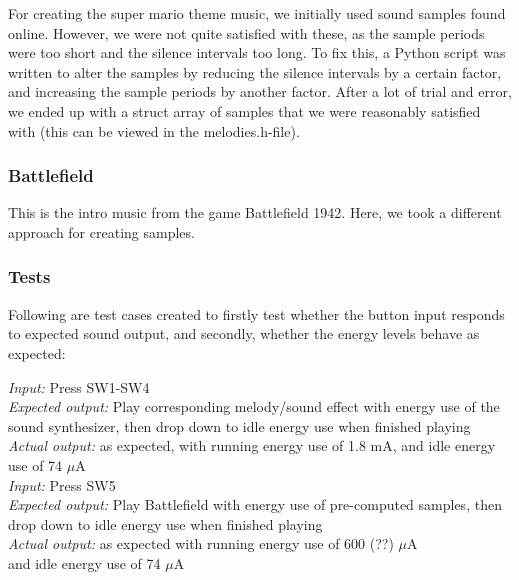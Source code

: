 For creating the super mario theme music, we initially used sound samples found online. However, we were not quite satisfied with these, as the sample periods were too short and the silence intervals too long. To fix this, a Python script was written to alter the samples by reducing the silence intervals by a certain factor, and increasing the sample periods by another factor. After a lot of trial and error, we ended up with a struct array of samples that we were reasonably satisfied with (this can be viewed in the melodies.h-file).

\subsubsection{Battlefield}

This is the intro music from the game Battlefield 1942. Here, we took a different approach for creating samples. 

\subsubsection{Tests}

Following are test cases created to firstly test whether the button input responds to expected sound output, and secondly, whether the energy levels behave as expected:



\emph{Input: } Press SW1-SW4\\
\emph{Expected output: } Play corresponding melody/sound effect with energy use of the sound synthesizer, then drop down to idle energy use when finished playing\\
\emph{Actual output: } as expected, with running energy use of 1.8 mA, and idle energy use of 74 $\mu$A \\


\emph{Input: } Press SW5\\
\emph{Expected output: } Play Battlefield with energy use of pre-computed samples, then drop down to idle energy use when finished playing\\
\emph{Actual output: } as expected with running energy use of 600 (??) $\mu$A \\ and idle energy use of 74 $\mu$A \\ 
